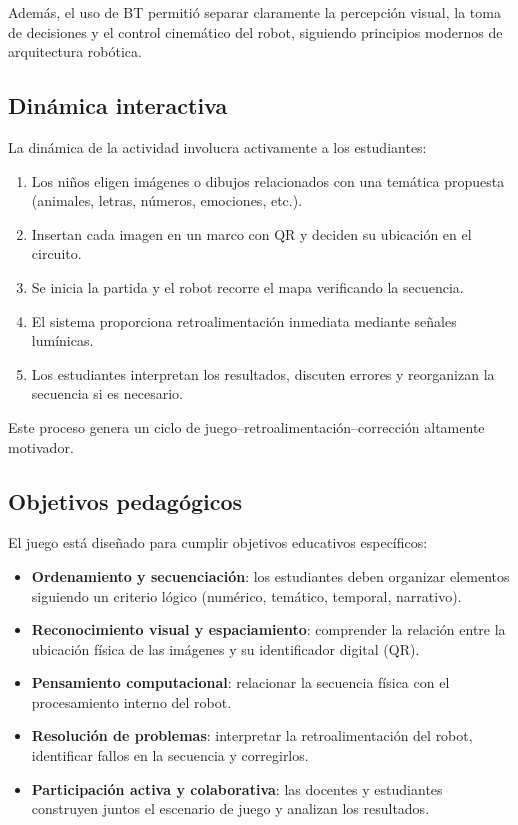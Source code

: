 \documentclass{prgrado}
\begin{document}
Además, el uso de BT permitió separar claramente la percepción visual, la toma de decisiones y el control cinemático del robot, siguiendo principios modernos de arquitectura robótica.

\subsection{Dinámica interactiva}

La dinámica de la actividad involucra activamente a los estudiantes:

\begin{enumerate}
    \item Los niños eligen imágenes o dibujos relacionados con una temática propuesta (animales, letras, números, emociones, etc.).
    \item Insertan cada imagen en un marco con QR y deciden su ubicación en el circuito.
    \item Se inicia la partida y el robot recorre el mapa verificando la secuencia.
    \item El sistema proporciona retroalimentación inmediata mediante señales lumínicas.
    \item Los estudiantes interpretan los resultados, discuten errores y reorganizan la secuencia si es necesario.
\end{enumerate}

Este proceso genera un ciclo de juego–retroalimentación–corrección altamente motivador.

\subsection{Objetivos pedagógicos}

El juego está diseñado para cumplir objetivos educativos específicos:

\begin{itemize}
    \item \textbf{Ordenamiento y secuenciación}: los estudiantes deben organizar elementos siguiendo un criterio lógico (numérico, temático, temporal, narrativo).
    \item \textbf{Reconocimiento visual y espaciamiento}: comprender la relación entre la ubicación física de las imágenes y su identificador digital (QR).
    \item \textbf{Pensamiento computacional}: relacionar la secuencia física con el procesamiento interno del robot.
    \item \textbf{Resolución de problemas}: interpretar la retroalimentación del robot, identificar fallos en la secuencia y corregirlos.
    \item \textbf{Participación activa y colaborativa}: las docentes y estudiantes construyen juntos el escenario de juego y analizan los resultados.
\end{itemize}
\end{document}
